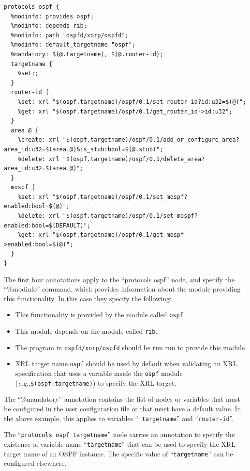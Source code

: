 \documentclass[11pt]{article}
\newcommand{\eg}{\emph{e.g.,}\xspace}
\begin{document}
\begin{verbatim}
protocols ospf {
  %modinfo: provides ospf;
  %modinfo: depends rib;
  %modinfo: path "ospfd/xorp/ospfd";
  %modinfo: default_targetname "ospf";
  %mandatory: $(@.targetname), $(@.router-id);
  targetname {
    %set:;
  }
  router-id {
    %set: xrl "$(ospf.targetname)/ospf/0.1/set_router_id?id:u32=$(@)";
    %get: xrl "$(ospf.targetname)/ospf/0.1/get_router_id->id:u32";
  }
  area @ {
    %create: xrl "$(ospf.targetname)/ospf/0.1/add_or_configure_area?area_id:u32=$(area.@)&is_stub:bool=$(@.stub)";
    %delete: xrl "$(ospf.targetname)/ospf/0.1/delete_area?area_id:u32=$(area.@)";
  }
  mospf {
    %set: xrl "$(ospf.targetname)/ospf/0.1/set_mospf?enabled:bool=$(@)";
    %delete: xrl "$(ospf.targetname)/ospf/0.1/set_mospf?enabled:bool=$(DEFAULT)";
    %get: xrl "$(ospf.targetname)/ospf/0.1/get_mospf->enabled:bool=$(@)";
  }
}
\end{verbatim}

The first four annotations apply to the ``protocols ospf'' node, and
specify the ``\%modinfo'' command, which provides information about
the module providing this functionality.  In this case they specify
the following:

\begin{itemize}

  \item This functionality is provided by the module called {\tt ospf}.

  \item This module depends on the module called {\tt rib}.

  \item The program in {\tt ospfd/xorp/ospfd} should be run run to
        provide this module.

  \item XRL target name {\tt ospf} should be used by default when validating
    an XRL specification that uses a variable inside the {\tt ospf} module
    (\eg {\tt \$(ospf.targetname)}) to specify the XRL target.

\end{itemize}

The ``\%mandatory'' annotation contains the list of nodes or variables
that must be configured in the user configuration file or that must
have a default value. In the above example, this applies to variables ``{\tt
  targetname}'' and ``{\tt router-id}''.

The ``{\tt protocols ospf targetname}'' node carries an annotation to
specify the existence of variable name ``{\tt targetname}'' that
can be used to specify the XRL target name of an OSPF instance.
The specific value of ``{\tt targetname}'' can be configured elsewhere.
\end{document}

